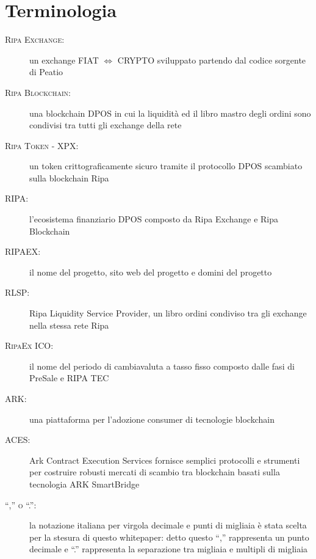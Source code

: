 \section{Terminologia}
\begin{description}
	\item[\textsc{Ripa Exchange:}] un exchange FIAT $\Leftrightarrow$ CRYPTO sviluppato partendo dal codice sorgente di Peatio \cite{peatio}
	\item[\textsc{Ripa Blockchain:}] una blockchain DPOS in cui la liquidità ed il libro mastro degli ordini sono condivisi tra tutti gli exchange della rete
	\item[\textsc{Ripa Token - XPX:}] un token crittograficamente sicuro tramite il protocollo DPOS scambiato sulla blockchain Ripa 
	\item[\textsc{RIPA:}] l'ecosistema finanziario DPOS composto da Ripa Exchange e Ripa Blockchain
	\item[\textsc{RIPAEX:}] il nome del progetto, sito web del progetto e domini del progetto
	\item[\textsc{RLSP:}] Ripa Liquidity Service Provider, un libro ordini condiviso tra gli exchange nella stessa rete Ripa
	\item[\textsc{RipaEx ICO:}] il nome del periodo di cambiavaluta a tasso fisso composto dalle fasi di PreSale e RIPA TEC	
	\item[\textsc{ARK:}] una piattaforma per l'adozione consumer di tecnologie blockchain \cite{ark}
	\item[\textsc{ACES:}] Ark Contract Execution Services \cite{aces} fornisce semplici protocolli e strumenti per costruire robusti
	mercati di scambio tra blockchain basati sulla tecnologia ARK SmartBridge
	\item[\textsc{``,'' o ``.'':}] la notazione italiana per virgola decimale e punti di migliaia è stata scelta per la stesura di questo 
	whitepaper: detto questo “,” rappresenta un punto decimale e “.” rappresenta la separazione tra migliaia e multipli di migliaia 
\end{description}


